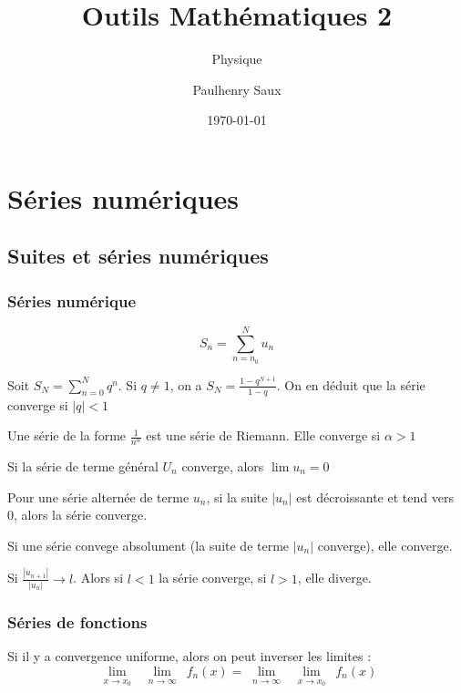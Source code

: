 \documentclass[french]{yLectureNote}
\title{Outils Mathématiques 2}
\subtitle{Physique}
\author{Paulhenry Saux}
\date{\today}
\newcommand{\Lim}[1]{\lim\limits_{\substack{#1}}\:}
\begin{document}
\setcounter{chapter}{3}
\chapter{Séries numériques }
\section{Suites et séries numériques}
\subsection{Séries numérique}
\begin{definition}
\[S_n = \sum_{n=n_0}^N u_n\]
\end{definition}
\begin{definition}
Soit \(S_N = \sum_{n=0}^N q^n\). Si \(q\neq 1\), on a \(S_N=\frac{1-q^{N+1}}{1-q}\). On en déduit que la série converge si \(|q|<1\)
\end{definition}
\begin{definition}
Une série de la forme \(\frac{1}{n^{\alpha}}\) est une série de Riemann. Elle converge si \(\alpha>1\)
\end{definition}
\begin{proposition}
Si la série de terme général \(U_n\) converge, alors \(\lim u_n =0\)
\end{proposition}
\begin{proposition}
Pour une série alternée de terme \(u_n\), si la suite \(|u_n|\) est décroissante et tend vers 0, alors la série converge.
\end{proposition}
\begin{proposition}
Si une série convege absolument (la suite de terme \(|u_n|\) converge), elle converge.
\end{proposition}
\begin{proposition}
Si \(\frac{|u_{n+1}|}{|u_n|}\to l\). Alors si \(l<1\) la série converge, si \(l>1\), elle diverge.
\end{proposition}
\subsection{Séries de fonctions}
\begin{theorem}
 Si il y a convergence uniforme, alors on peut inverser les limites : \[\Lim{x\to x_0}\Lim{n\to\infty}f_n(x) = \Lim{n\to\infty}\Lim{x\to x_0}f_n(x)\]
\end{theorem}
\end{document}
